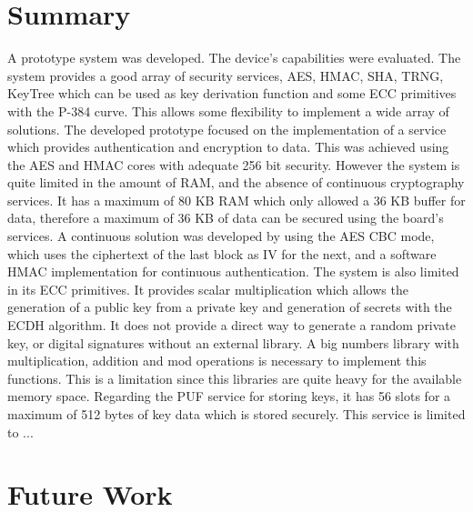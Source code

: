 \cleardoublepage
\label{chap:conclusion}

\section{Summary} \label{chap:conclusion:summary}

A prototype system was developed. The device's capabilities were evaluated.
The system provides a good array of security services, AES, HMAC, SHA, TRNG, KeyTree which can be used as key derivation function and some ECC primitives with the P-384 curve.
This allows some flexibility to implement a wide array of solutions.
The developed prototype focused on the implementation of a service which provides authentication and encryption to data. This was achieved using the AES and HMAC cores with adequate 256 bit security. However the system is quite limited in the amount of RAM, and the absence of continuous cryptography services. It has a maximum of 80 KB RAM which only allowed a 36 KB buffer for data, therefore a maximum of 36 KB of data can be secured using the board's services. A continuous solution was developed by using the AES CBC mode, which uses the ciphertext of the last block as IV for the next, and a software HMAC implementation for continuous authentication.
The system is also limited in its ECC primitives. It provides scalar multiplication which allows the generation of a public key from a private key and generation of secrets with the \ac{ECDH} algorithm. It does not provide a direct way to generate a random private key, or digital signatures without an external library. A big numbers library with multiplication, addition and mod operations is necessary to implement this functions. This is a limitation since this libraries are quite heavy for the available memory space.
Regarding the PUF service for storing keys, it has 56 slots for a maximum of 512 bytes of key data which is stored securely. This service is limited to ...

\section{Future Work} \label{chap:conclusion:future-work}

